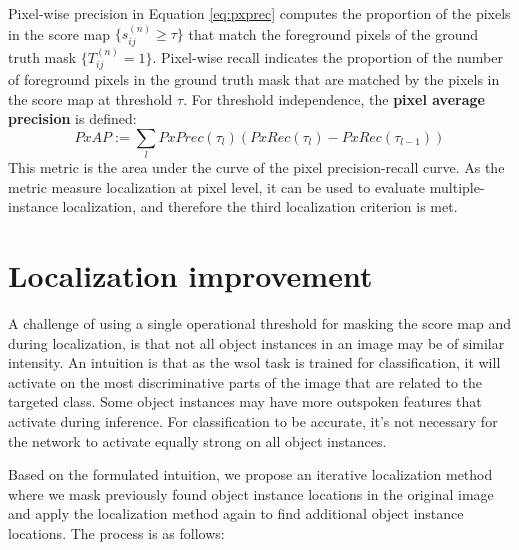 Pixel-wise precision in Equation \ref{eq:pxprec} computes the proportion of the pixels in the score map $\{ s^{(n)}_{ij} \ge \tau \}$ that match the foreground pixels of the ground truth mask $\{ T^{(n)}_{ij} = 1 \}$. Pixel-wise recall indicates the proportion of the number of foreground pixels in the ground truth mask that are matched by the pixels in the score map at threshold $\tau$. For threshold independence, the \textbf{pixel average precision} is defined:
\begin{equation}
    PxAP := \sum_{l} PxPrec(\tau_{l})(PxRec(\tau_{l}) - PxRec(\tau_{l-1}))
\end{equation}
This metric is the area under the curve of the pixel precision-recall curve. As the metric measure localization at pixel level, it can be used to evaluate multiple-instance localization, and therefore the third localization criterion is met.

\section{Localization improvement} \label{sec:method_localization_improvement}
A challenge of using a single operational threshold for masking the score map and during localization, is that not all object instances in an image may be of similar intensity. An intuition is that as the \acrshort{wsol} task is trained for classification, it will activate on the most discriminative parts of the image that are related to the targeted class. Some object instances may  have more outspoken features that activate during inference. For classification to be accurate, it's not necessary for the network to activate equally strong on all object instances.

Based on the formulated intuition, we propose an iterative localization method where we mask previously found object instance locations in the original image and apply the localization method again to find additional object instance locations. The process is as follows:

